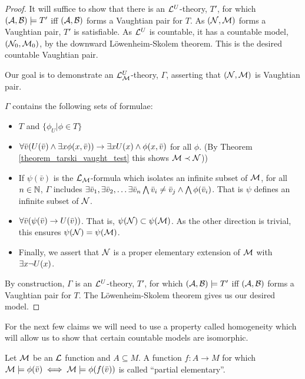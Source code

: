 \begin{proof}
It will suffice to show that there is an \(\mathcal{L}^U\)-theory, \(T'\), for which \((\mathcal{A}, \mathcal{B}) \models T'\) iff \((\mathcal{A}, \mathcal{B})\) forms a Vaughtian pair for \(T\). 
As \((\mathcal{N}, \mathcal{M})\) forms a Vaughtian pair, \(T'\) is satisfiable.
As \(\mathcal{L}^U\) is countable, it has a countable model, \((\mathcal{N}_0, \mathcal{M}_0)\), by the downward L\"owenheim-Skolem theorem.
This is the desired countable Vaughtian pair. 

Our goal is to demonstrate an \(\mathcal{L}_{\mathcal{M}}^U\)-theory, \(\Gamma\), asserting that \((\mathcal{N}, \mathcal{M})\) is Vaughtian pair.

\(\Gamma\) contains the following sets of formulae:
\begin{itemize}
\item \(T\) and \(\{\phi_U | \phi \in T\}\)
\item \(\forall \bar{v} (U(\bar{v}) \land \exists x \phi(x, \bar{v})) \to \exists x U(x) \land \phi(x, \bar{v})\) for all \(\phi\). (By Theorem \ref{theorem_tarski_vaught_test} this shows \(\mathcal{M} \prec \mathcal{N}\))) 
\item If \(\psi(\bar{v})\) is the \(\mathcal{L}_{\mathcal{M}}\)-formula which isolates an infinite subset of \(\mathcal{M}\), for all \(n \in \mathbb{N}\), \(\Gamma\) includes \(\exists \bar{v}_1, \exists \bar{v}_2, \ldots \exists \bar{v}_n \bigwedge \bar{v}_i \neq \bar{v}_j \land \bigwedge \phi(\bar{v}_i)\). That is \(\psi\) defines an infinite subset of \(\mathcal{N}\).
\item \(\forall \bar{v} (\psi(\bar{v}) \to U(\bar{v}))\). That is, \(\psi(\mathcal{N}) \subset \psi(\mathcal{M})\). As the other direction is trivial, this ensures \(\psi(\mathcal{N}) = \psi(\mathcal{M})\). 
\item Finally, we assert that \(\mathcal{N}\) is a proper elementary extension of \(\mathcal{M}\) with \(\exists x \neg U(x)\). 
\end{itemize}

By construction, \(\Gamma\) is an \(\mathcal{L}^U\)-theory, \(T'\), for which \((\mathcal{A}, \mathcal{B}) \models T'\) iff \((\mathcal{A}, \mathcal{B})\) forms a Vaughtian pair for \(T\). 
The L\"owenheim-Skolem theorem gives us our desired model. 
\end{proof}

For the next few claims we will need to use a property called homogeneity which will allow us to show that certain countable models are isomorphic.

\begin{definition}\label{definition_partial_elementary}
Let \(\mathcal{M}\) be an \(\mathcal{L}\) function and \(A \subseteq M\).
A function \(f:A \to M\) for which \(\mathcal{M} \models \phi(\bar{v}) \iff \mathcal{M} \models \phi(f(\bar{v}))\) is called ``partial elementary''.
\end{definition}

